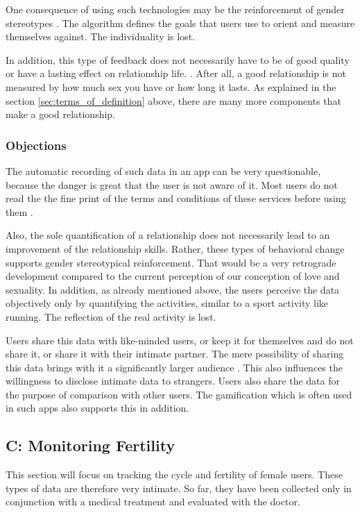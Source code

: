 One consequence of using such technologies may be the reinforcement of gender stereotypes \cite{doi:10.1080/13691058.2014.920528}. The algorithm defines the goals that users use to orient and measure themselves against. The individuality is lost.

In addition, this type of feedback does not necessarily have to be of good quality or have a lasting effect on relationship life. \cite{doi:10.1080/15265161.2017.1409823}. After all, a good relationship is not measured by how much sex you have or how long it lasts. As explained in the section \ref{sec:terms_of_definition} above, there are many more components that make a good relationship.

\subsubsection{Objections}
The automatic recording of such data in an app can be very questionable, because the danger is great that the user is not aware of it. Most users do not read the the fine print of the terms and conditions of these services before using them \cite{levy2014intimate}.

Also, the sole quantification of a relationship does not necessarily lead to an improvement of the relationship skills. Rather, these types of behavioral change supports gender stereotypical reinforcement. That would be a very retrograde development compared to the current perception of our conception of love and sexuality. %
In addition, as already mentioned above, the users perceive the data objectively only by quantifying the activities, similar to a sport activity like running. The reflection of the real activity is lost.

Users share this data with like-minded users, or keep it for themselves and do not share it, or share it with their intimate partner.
The mere possibility of sharing this data brings with it a significantly larger audience \cite{doi:10.1080/13691058.2014.920528}. This also influences the willingness to disclose intimate data to strangers.
Users also share the data for the purpose of comparison with other users. The gamification which is often used in such apps also supports this in addition.

\subsection{C: Monitoring Fertility}
\label{sec:c}
This section will focus on tracking the cycle and fertility of female users. These types of data are therefore very intimate. So far, they have been collected only in conjunction with a medical treatment and evaluated with the doctor.
